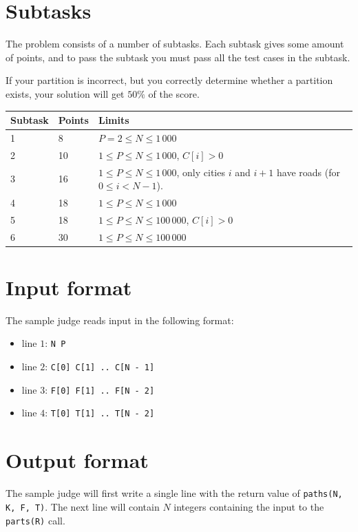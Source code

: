 \section*{Subtasks}
The problem consists of a number of subtasks. Each subtask gives some amount of points, and to pass
the subtask you must pass all the test cases in the subtask.

If your partition is incorrect, but you correctly determine whether a partition exists, your solution
will get $50\%$ of the score. 
\begin{tabular}{|l|l|l|}
  \hline
  \textbf{Subtask} & \textbf{Points} & \textbf{Limits} \\ \hline
  1 & 8 & $P = 2 \le N \le 1\,000$ \\ \hline
  2 & 10 & $1 \le P \le N \le 1\,000$, $C[i] > 0$ \\ \hline
  3 & 16 & $1 \le P \le N \le 1\,000$, only cities $i$ and $i + 1$ have roads (for $0 \le i < N - 1$). \\ \hline
  4 & 18 & $1 \le P \le N \le 1\,000$ \\ \hline
  5 & 18 & $1 \le P \le N \le 100\,000$, $C[i] > 0$ \\ \hline
  6 & 30 & $1 \le P \le N \le 100\,000$ \\ \hline
\end{tabular}

\section*{Input format}
The sample judge reads input in the following format:

\begin{itemize}
  \item line $1$: \texttt{N P}
  \item line $2$: \texttt{C[0] C[1] .. C[N - 1]}
  \item line $3$: \texttt{F[0] F[1] .. F[N - 2]}
  \item line $4$: \texttt{T[0] T[1] .. T[N - 2]}
\end{itemize}

\section*{Output format}
The sample judge will first write a single line with the return value of \texttt{paths(N, K, F, T)}. The next line will contain $N$ integers containing the input to the \texttt{parts(R)} call.
